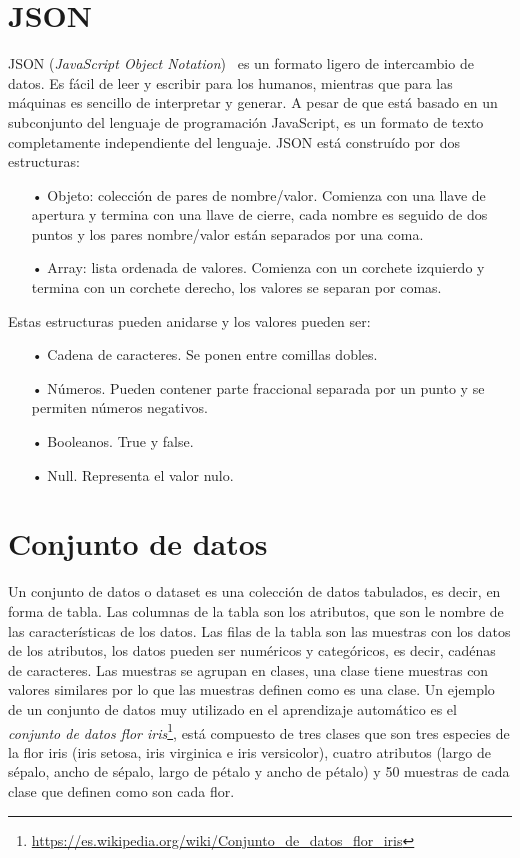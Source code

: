 \documentclass[a4paper, 12pt]{book}
\begin{document}
\section{JSON} 
\label{sec:JSON}

JSON (\emph{JavaScript Object Notation})~\cite{Pagina_de_JSON} es un formato ligero de intercambio de datos. Es fácil de leer y escribir para los humanos, mientras que para las máquinas es sencillo de interpretar y generar. A pesar de que está basado en un subconjunto del lenguaje de programación JavaScript, es un formato de texto completamente independiente del lenguaje. JSON está construído por dos estructuras:

\begin{itemize}
	\item[•] Objeto: colección de pares de nombre/valor. Comienza con una llave de apertura y termina con una llave de cierre, cada nombre es seguido de dos puntos y los pares nombre/valor están separados por una coma.
	\item[•] Array: lista ordenada de valores. Comienza con un corchete izquierdo y termina con un corchete derecho, los valores se separan por comas.
\end{itemize}

Estas estructuras pueden anidarse y los valores pueden ser:
	\begin{itemize}
		\item[•] Cadena de caracteres. Se ponen entre comillas dobles.
		\item[•] Números. Pueden contener parte fraccional separada por un punto y se permiten números negativos.
		\item[•] Booleanos. True y false.
		\item[•] Null. Representa el valor nulo.
	\end{itemize}

\section{Conjunto de datos} 
\label{sec:dataset}

Un conjunto de datos o dataset es una colección de datos tabulados, es decir, en forma de tabla. Las columnas de la tabla son los atributos, que son le nombre de las características de los datos. Las filas de la tabla son las muestras con los datos de los atributos, los datos pueden ser numéricos y categóricos, es decir, cadénas de caracteres. Las muestras se agrupan en clases, una clase tiene muestras con valores similares por lo que las muestras definen como es una clase. Un ejemplo de un conjunto de datos muy utilizado en el aprendizaje automático es el \emph{conjunto de datos flor iris}\footnote{\url{https://es.wikipedia.org/wiki/Conjunto_de_datos_flor_iris}}, está compuesto de tres clases que son tres especies de la flor iris (iris setosa, iris virginica e iris versicolor), cuatro atributos (largo de sépalo, ancho de sépalo, largo de pétalo y ancho de pétalo) y 50 muestras de cada clase que definen como son cada flor.
\end{document}
